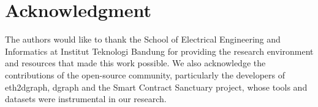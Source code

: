 \section*{Acknowledgment}

The authors would like to thank the School of Electrical Engineering and Informatics at Institut Teknologi Bandung for providing the research environment and resources that made this work possible. We also acknowledge the contributions of the open-source community, particularly the developers of eth2dgraph, dgraph and the Smart Contract Sanctuary project, whose tools and datasets were instrumental in our research.
